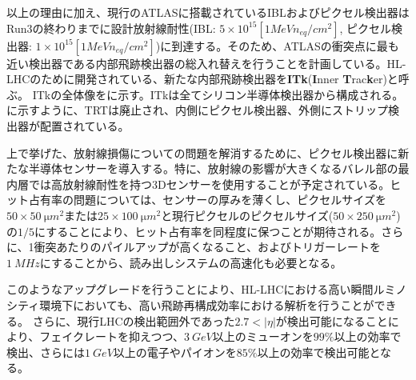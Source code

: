 以上の理由に加え、現行のATLASに搭載されているIBLおよびピクセル検出器はRun3の終わりまでに設計放射線耐性(IBL: $5 \times 10^{15} [\si{1 MeV n_{eq} /cm^2}]$, ピクセル検出器: $1 \times 10^{15} [\si{1 MeV n_{eq} /cm^2}]$)に到達する。そのため、ATLASの衝突点に最も近い検出器である内部飛跡検出器の総入れ替えを行うことを計画している。HL-LHCのために開発されている、新たな内部飛跡検出器を\textbf{ITk}(\textbf{I}nner \textbf{T}rac\textbf{k}er)と呼ぶ。
ITkの全体像をに示す。ITkは全てシリコン半導体検出器から構成される。に示すように、TRTは廃止され、内側にピクセル検出器、外側にストリップ検出器が配置されている。

上で挙げた、放射線損傷についての問題を解消するために、ピクセル検出器に新たな半導体センサーを導入する。特に、放射線の影響が大きくなるバレル部の最内層では高放射線耐性を持つ3Dセンサーを使用することが予定されている。ヒット占有率の問題については、センサーの厚みを薄くし、ピクセルサイズを$50\times 50\ \si{\micro m^2}$または$25\times 100\ \si{\micro m^2}$と現行ピクセルのピクセルサイズ($50\times250\ \si{\micro m^2}$)の$1/5$にすることにより、ヒット占有率を同程度に保つことが期待される。さらに、1衝突あたりのパイルアップが高くなること、およびトリガーレートを$1\ \si{MHz}$にすることから、読み出しシステムの高速化も必要となる。


このようなアップグレードを行うことにより、HL-LHCにおける高い瞬間ルミノシティ環境下においても、高い飛跡再構成効率における解析を行うことができる。
さらに、現行LHCの検出範囲外であった$2.7<|\eta|$が検出可能になることにより、フェイクレートを抑えつつ、$3\ \si{GeV}$以上のミューオンを$99\si{\%}$以上の効率で検出、さらには$1\ \si{GeV}$以上の電子やパイオンを$85\si{\%}$以上の効率で検出可能となる。



